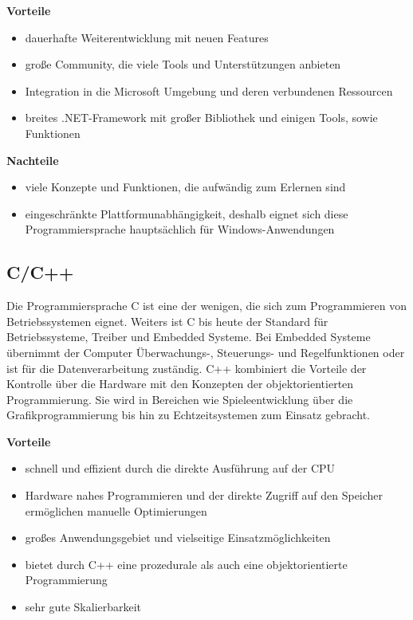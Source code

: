 \textbf{Vorteile}
\begin{itemize}
	\item dauerhafte Weiterentwicklung mit neuen Features
	\item große Community, die viele Tools und Unterstützungen anbieten
	\item Integration in die Microsoft Umgebung und deren verbundenen Ressourcen
	\item breites .NET-Framework mit großer Bibliothek und einigen Tools, sowie Funktionen
\end{itemize}

\textbf{Nachteile}
\begin{itemize}
	\item viele Konzepte und Funktionen, die aufwändig zum Erlernen sind
	\item eingeschränkte Plattformunabhängigkeit, deshalb eignet sich diese Programmiersprache hauptsächlich für Windows-Anwendungen
\end{itemize}

\subsection{C/C++}
Die Programmiersprache C ist eine der wenigen, die sich zum Programmieren von Betriebssystemen eignet. Weiters ist C bis heute der Standard für Betriebssysteme, Treiber und Embedded Systeme. Bei Embedded Systeme übernimmt der Computer Überwachungs-, Steuerungs- und Regelfunktionen oder ist für die Datenverarbeitung zuständig. C++ kombiniert die Vorteile der Kontrolle über die Hardware mit den Konzepten der objektorientierten Programmierung. Sie wird in Bereichen wie Spieleentwicklung über die Grafikprogrammierung bis hin zu Echtzeitsystemen zum Einsatz gebracht. \parencite{Programmiersprachen}

\textbf{Vorteile}
\begin{itemize}
	\item schnell und effizient durch die direkte Ausführung auf der CPU
	\item Hardware nahes Programmieren und der direkte Zugriff auf den Speicher ermöglichen manuelle Optimierungen
	\item großes Anwendungsgebiet und vielseitige Einsatzmöglichkeiten
	\item bietet durch C++ eine prozedurale als auch eine objektorientierte Programmierung
	\item sehr gute Skalierbarkeit
\end{itemize}

